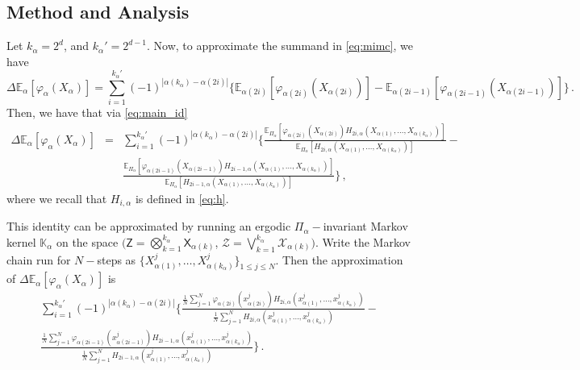 \documentclass[english]{article}
\begin{document}
\subsection{Method and Analysis}

Let $k_{\alpha}=2^d$, and $k_{\alpha}'=2^{d-1}$.
Now, to approximate the summand in \eqref{eq:mimc}, we have
$$
\Delta \mathbb{E}_{\alpha}[\varphi_{\alpha}(X_{\alpha})] = \sum_{i=1}^{k_{\alpha}'}
(-1)^{|\alpha(k_{\alpha})-\alpha(2i)|}
\{\mathbb{E}_{\alpha(2i)}[\varphi_{\alpha(2i)}(X_{\alpha(2i)})] - 
\mathbb{E}_{\alpha(2i-1)}[\varphi_{\alpha(2i-1)}(X_{\alpha(2i-1)})]
\} \, . 
$$
Then, we have that via \eqref{eq:main_id}
\begin{eqnarray*}
\Delta \mathbb{E}_{\alpha}[\varphi_{\alpha}(X_{\alpha})] & = &
\sum_{i=1}^{k_{\alpha}'}(-1)^{|\alpha(k_{\alpha})-\alpha(2i)|}
\Bigg\{
\frac{
\mathbb{E}_{\Pi_{\alpha}}[\varphi_{\alpha(2i)}(X_{\alpha(2i)})
H_{2i,\alpha}(X_{\alpha(1)},\dots,X_{\alpha(k_{\alpha})})]
}
{
\mathbb{E}_{\Pi_{\alpha}}[H_{2i,\alpha}(X_{\alpha(1)},\dots,X_{\alpha(k_{\alpha})})]
}
- \\ & & 
\frac{
\mathbb{E}_{\Pi_{\alpha}}[\varphi_{\alpha(2i-1)}(X_{\alpha(2i-1)})
H_{2i-1,\alpha}(X_{\alpha(1)},\dots,X_{\alpha(k_{\alpha})})]
}
{
\mathbb{E}_{\Pi_{\alpha}}[H_{2i-1,\alpha}(X_{\alpha(1)},\dots,X_{\alpha(k_{\alpha})})]
}
\Bigg\} \, ,
\end{eqnarray*}
where we recall that $H_{i,\alpha}$ is defined in \eqref{eq:h}.

This identity can be approximated by running an ergodic $\Pi_{\alpha}-$invariant Markov kernel $\mathbb{K}_\alpha$ on the 
space $(\mathsf{Z} = \bigotimes_{k=1}^{k_{\alpha}} \mathsf{X}_{\alpha(k)}$, $\mathcal{Z} = \bigvee_{k=1}^{k_{\alpha}} \mathcal{X}_{\alpha(k)})$.
Write the Markov chain run for $N-$steps as $\{X^j_{\alpha(1)},\dots,X^j_{\alpha(k_{\alpha})}\}_{1\leq j \leq N}$.
Then the approximation of $\Delta \mathbb{E}_{\alpha}[\varphi_{\alpha}(X_{\alpha})]$ is
\begin{eqnarray}\label{eq:mimcmc_full}
\sum_{i=1}^{k_{\alpha}'}(-1)^{|\alpha(k_{\alpha})-\alpha(2i)|}
\Bigg\{
\frac{
\frac{1}{N}\sum_{j=1}^N
\varphi_{\alpha(2i)}(x^j_{\alpha(2i)})
H_{2i,\alpha}(x^j_{\alpha(1)},\dots,x^j_{\alpha(k_{\alpha})})
}
{
\frac{1}{N}\sum_{j=1}^N
H_{2i,\alpha}(x^j_{\alpha(1)},\dots,x^j_{\alpha(k_{\alpha})})
} -
\\
\nonumber
\frac{
\frac{1}{N}\sum_{j=1}^N
\varphi_{\alpha(2i-1)}(x^j_{\alpha(2i-1)})
H_{2i-1,\alpha}(x^j_{\alpha(1)},\dots,x^j_{\alpha(k_{\alpha})})
}
{
\frac{1}{N}\sum_{j=1}^N
H_{2i-1,\alpha}(x^j_{\alpha(1)},\dots,x^j_{\alpha(k_{\alpha})})
} 
\Bigg\} \, .
\end{eqnarray}
\end{document}
